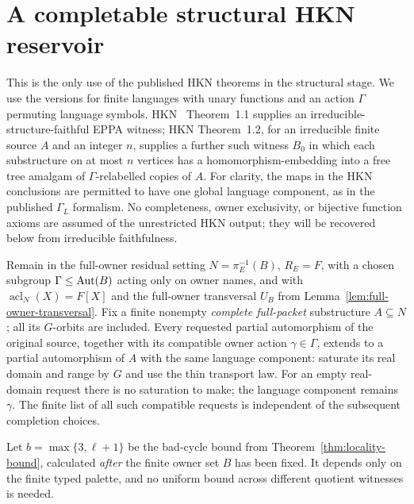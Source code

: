 \section{A completable structural HKN reservoir}\label{sec:hkn-reservoir}

This is the only use of the published HKN theorems in the structural
stage.  We use the versions for finite languages with unary
functions and an action $\Gamma$ permuting language symbols.  HKN~\cite{HKN}
Theorem~1.1 supplies an irreducible-structure-faithful EPPA witness;
HKN Theorem~1.2, for an irreducible finite source $A$ and an
integer $n$, supplies a further such witness $B_0$ in which each
substructure on at most $n$ vertices has a homomorphism-embedding
into a free tree amalgam of $\Gamma$-relabelled copies of $A$.
For clarity, the maps in the HKN conclusions are permitted to have
one global language component, as in the published $\Gamma_L$
formalism.  No completeness, owner exclusivity, or bijective
function axioms are assumed of the unrestricted HKN output;
they will be recovered below from irreducible faithfulness.

Remain in the full-owner residual setting
$N=\pi_E^{-1}(B)$, $R_E=F$, with a chosen subgroup
$\Gamma\le\operatorname{Aut}(B)$ acting only on owner names, and with
$\operatorname{acl}_N(X)=F[X]$ and the full-owner transversal
$U_B$ from Lemma~\ref{lem:full-owner-transversal}.
Fix a finite nonempty \emph{complete full-packet} substructure
$A\subseteq N$; all its $G$-orbits are included.  Every
requested partial automorphism of the original source, together
with its compatible owner action $\gamma\in\Gamma$, extends to
a partial automorphism of $A$ with the same language component:
saturate its real domain and range by $G$ and use the thin
transport law.  For an empty real-domain request there is no
saturation to make; the language component remains $\gamma$.
The finite list of all such compatible requests is independent of
the subsequent completion choices.

Let $b=\max\{3,\ell+1\}$ be the bad-cycle bound from
Theorem~\ref{thm:locality-bound}, calculated \emph{after} the
finite owner set $B$ has been fixed.  It depends only on the
finite typed palette, and no uniform bound across different
quotient witnesses is needed.

